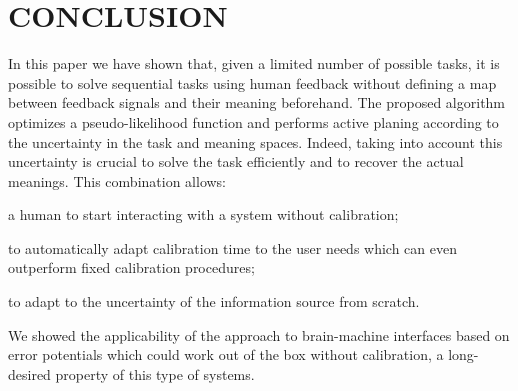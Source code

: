\section{CONCLUSION}
\label{sec:conclusion}




In this paper we have shown that, given a limited number of possible tasks, it is possible to solve sequential tasks using human feedback without defining a map between feedback signals and their meaning beforehand. The proposed algorithm optimizes a pseudo-likelihood function and performs active planing according to the uncertainty in the task and meaning spaces. Indeed, taking into account this uncertainty is crucial to solve the task efficiently and to recover the actual meanings. This combination allows: 
\begin{inparaenum}[a)]
\item a human to start interacting with a system without calibration;
\item to automatically adapt calibration time to the user needs which can even outperform fixed calibration procedures; 
\item to adapt to the uncertainty of the information source from scratch.
\end{inparaenum}
We showed the applicability of the approach to brain-machine interfaces based on error potentials which could work out of the box without calibration, a long-desired property of this type of systems.  


